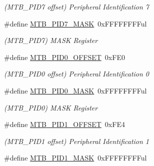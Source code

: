 \begin{DoxyCompactItemize}
\begin{DoxyCompactList}\small\item\em (M\+T\+B\+\_\+\+P\+I\+D7 offset) Peripheral Identification 7 \end{DoxyCompactList}\item 
\hypertarget{group___s_a_m_l21___m_t_b_ga1e42e23c8053324cc941accb82fae2f0}{}\#define \hyperlink{group___s_a_m_l21___m_t_b_ga1e42e23c8053324cc941accb82fae2f0}{M\+T\+B\+\_\+\+P\+I\+D7\+\_\+\+M\+A\+S\+K}~0x\+F\+F\+F\+F\+F\+F\+F\+Ful\label{group___s_a_m_l21___m_t_b_ga1e42e23c8053324cc941accb82fae2f0}

\begin{DoxyCompactList}\small\item\em (M\+T\+B\+\_\+\+P\+I\+D7) M\+A\+S\+K Register \end{DoxyCompactList}\item 
\hypertarget{group___s_a_m_l21___m_t_b_gad03f4fd792b587adbd717f3255dc528e}{}\#define \hyperlink{group___s_a_m_l21___m_t_b_gad03f4fd792b587adbd717f3255dc528e}{M\+T\+B\+\_\+\+P\+I\+D0\+\_\+\+O\+F\+F\+S\+E\+T}~0x\+F\+E0\label{group___s_a_m_l21___m_t_b_gad03f4fd792b587adbd717f3255dc528e}

\begin{DoxyCompactList}\small\item\em (M\+T\+B\+\_\+\+P\+I\+D0 offset) Peripheral Identification 0 \end{DoxyCompactList}\item 
\hypertarget{group___s_a_m_l21___m_t_b_gac18d6f5c996cccee534a4590f3b0e9d8}{}\#define \hyperlink{group___s_a_m_l21___m_t_b_gac18d6f5c996cccee534a4590f3b0e9d8}{M\+T\+B\+\_\+\+P\+I\+D0\+\_\+\+M\+A\+S\+K}~0x\+F\+F\+F\+F\+F\+F\+F\+Ful\label{group___s_a_m_l21___m_t_b_gac18d6f5c996cccee534a4590f3b0e9d8}

\begin{DoxyCompactList}\small\item\em (M\+T\+B\+\_\+\+P\+I\+D0) M\+A\+S\+K Register \end{DoxyCompactList}\item 
\hypertarget{group___s_a_m_l21___m_t_b_gac8accff9ba83615614e067bbd8dcf329}{}\#define \hyperlink{group___s_a_m_l21___m_t_b_gac8accff9ba83615614e067bbd8dcf329}{M\+T\+B\+\_\+\+P\+I\+D1\+\_\+\+O\+F\+F\+S\+E\+T}~0x\+F\+E4\label{group___s_a_m_l21___m_t_b_gac8accff9ba83615614e067bbd8dcf329}

\begin{DoxyCompactList}\small\item\em (M\+T\+B\+\_\+\+P\+I\+D1 offset) Peripheral Identification 1 \end{DoxyCompactList}\item 
\hypertarget{group___s_a_m_l21___m_t_b_ga79fe1f4f5ada0501536d4bd991b4b69f}{}\#define \hyperlink{group___s_a_m_l21___m_t_b_ga79fe1f4f5ada0501536d4bd991b4b69f}{M\+T\+B\+\_\+\+P\+I\+D1\+\_\+\+M\+A\+S\+K}~0x\+F\+F\+F\+F\+F\+F\+F\+Ful\label{group___s_a_m_l21___m_t_b_ga79fe1f4f5ada0501536d4bd991b4b69f}


\end{DoxyCompactItemize}
